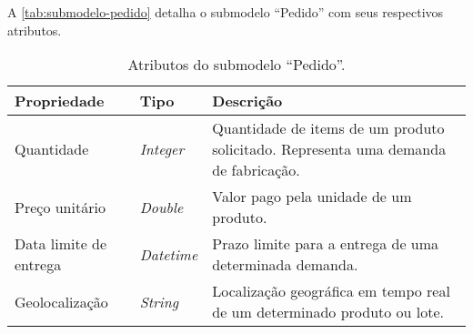 A \autoref{tab:submodelo-pedido} detalha o submodelo ``Pedido'' com seus respectivos atributos.

\begin{table}[htb]
	\centering
	\caption{Atributos do submodelo ``Pedido''.}
	\begin{tabular}{p{3.5cm}p{1.5cm}p{9cm}}
		\hline
		\textbf{Propriedade}
		 & \textbf{Tipo}
		 & \textbf{Descrição}                                                                  \\

		\hline
		Quantidade
		 & \textit{Integer}
		 & Quantidade de items de um produto solicitado. Representa uma demanda de fabricação. \\

		\hline
		Preço unitário
		 & \textit{Double}
		 & Valor pago pela unidade de um produto.                                              \\

		\hline
		Data limite de entrega
		 & \textit{Datetime}
		 & Prazo limite para a entrega de uma determinada demanda.                             \\

		\hline
		Geolocalização
		 & \textit{String}
		 & Localização geográfica em tempo real de um determinado produto ou lote.             \\

		\hline
	\end{tabular}
	\label{tab:submodelo-pedido}
\end{table}

\newpage





